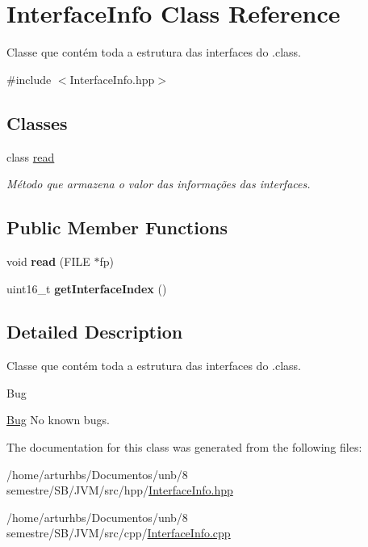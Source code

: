 \hypertarget{classInterfaceInfo}{}\section{Interface\+Info Class Reference}
\label{classInterfaceInfo}


Classe que contém toda a estrutura das interfaces do .class.  




{\ttfamily \#include $<$Interface\+Info.\+hpp$>$}

\subsection*{Classes}
\begin{DoxyCompactItemize}
\item 
class \hyperlink{classInterfaceInfo_1_1read}{read}
\begin{DoxyCompactList}\small\item\em Método que armazena o valor das informações das interfaces. \end{DoxyCompactList}\end{DoxyCompactItemize}
\subsection*{Public Member Functions}
\begin{DoxyCompactItemize}
\item 
void {\bfseries read} (F\+I\+LE $\ast$fp)\hypertarget{classInterfaceInfo_aa26a7efe110f489c3b3c07e0929e1fb1}{}\label{classInterfaceInfo_aa26a7efe110f489c3b3c07e0929e1fb1}

\item 
uint16\+\_\+t {\bfseries get\+Interface\+Index} ()\hypertarget{classInterfaceInfo_af7ab62416f54dc3b2a74a21f4d16d812}{}\label{classInterfaceInfo_af7ab62416f54dc3b2a74a21f4d16d812}

\end{DoxyCompactItemize}


\subsection{Detailed Description}
Classe que contém toda a estrutura das interfaces do .class. 

\begin{DoxyRefDesc}{Bug}
\item[\hyperlink{bug__bug000027}{Bug}]No known bugs. \end{DoxyRefDesc}


The documentation for this class was generated from the following files\+:\begin{DoxyCompactItemize}
\item 
/home/arturhbs/\+Documentos/unb/8 semestre/\+S\+B/\+J\+V\+M/src/hpp/\hyperlink{InterfaceInfo_8hpp}{Interface\+Info.\+hpp}\item 
/home/arturhbs/\+Documentos/unb/8 semestre/\+S\+B/\+J\+V\+M/src/cpp/\hyperlink{InterfaceInfo_8cpp}{Interface\+Info.\+cpp}\end{DoxyCompactItemize}
